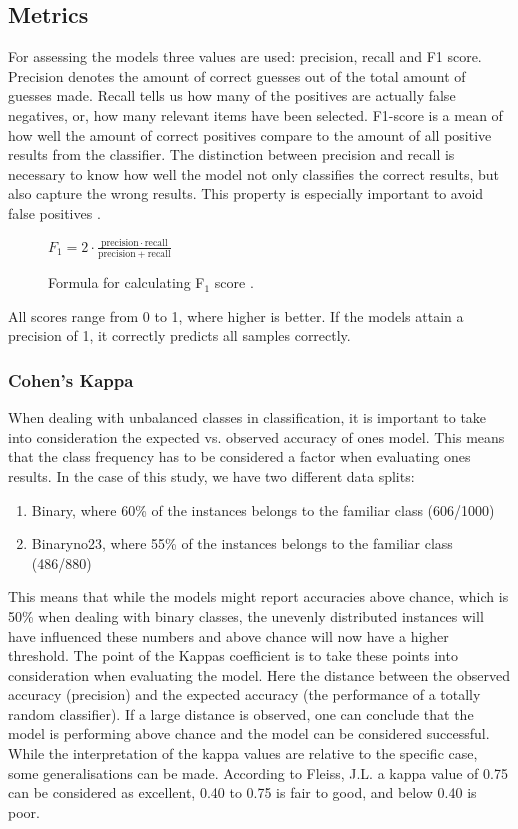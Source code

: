 \documentclass{llncs}
\begin{document}
\subsection{Metrics}
For assessing the models three values are used: precision, recall and F1 score. Precision denotes the amount of correct guesses out of the total amount of guesses made. Recall tells us how many of the positives are actually false negatives, or, how many relevant items have been selected. F1-score is a mean of how well the amount of correct positives compare to the amount of all positive results from the classifier. The distinction between precision and recall is necessary to know how well the model not only classifies the correct results, but also capture the wrong results. This property is especially important to avoid false positives \cite{agresti2009}.

\begin{figure}
\centering
\caption{Formula for calculating F$_{1}$ score \cite{w:precision}.}
$F_1 = 2 \cdot \frac{\mathrm{precision} \cdot \mathrm{recall}}{\mathrm{precision} + \mathrm{recall}}$
\end{figure}

All scores range from 0 to 1, where higher is better. If the models attain a precision of 1, it correctly predicts all samples correctly.

\subsubsection{Cohen's Kappa}
When dealing with unbalanced classes in classification, it is important to take into consideration the expected vs. observed accuracy of ones model. This means that the class frequency has to be considered a factor when evaluating ones results. In the case of this study, we have two different data splits: 

\begin{enumerate}
\item Binary, where 60\% of the instances belongs to the familiar class (606/1000)
\item Binaryno23, where 55\% of the instances belongs to the familiar class (486/880)
\end{enumerate}

This means that while the models might report accuracies above chance, which is 50\% when dealing
with binary classes, the unevenly distributed instances will have influenced these numbers and above chance will now have a higher threshold. The point of the Kappas coefficient is to take these points into consideration when evaluating the model. Here the distance between the observed accuracy (precision) and the expected accuracy (the performance of a totally random classifier). If a large distance is observed, one can conclude that the model is performing above chance and the model can be considered successful. While the interpretation of the kappa values are relative to the specific case, some generalisations can be made. According to Fleiss, J.L. \cite{kappa} a kappa value of 0.75 can be considered as excellent, 0.40 to 0.75 is fair to good, and below 0.40 is poor. 
\end{document}
